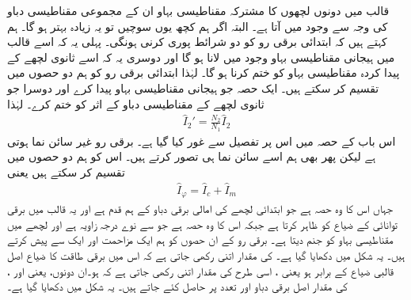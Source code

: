 قالب میں دونوں لچھوں کا مشترکہ مقناطیسی بہاو ان کے مجموعی مقناطیسی دباو کی وجہ سے وجود میں آتا ہے۔ البتہ اگر ہم کچھ یوں سوچیں تو یہ زیادہ بہتر ہو گا۔ ہم کہتے ہیں کہ ابتدائی برقی رو کو دو شرائط پوری کرنی ہونگی۔ پہلی یہ کہ اسے قالب میں ہیجانی مقناطیسی بہاو وجود میں لانا ہو گا اور دوسری یہ کہ اسے ثانوی لچھے کے پیدا کردہ مقناطیسی بہاو کو ختم کرنا ہو گا۔ لہٰذا ابتدائی برقی رو کو ہم دو حصوں میں تقسیم کر سکتے ہیں۔ ایک حصہ  جو ہیجانی مقناطیسی بہاو پیدا کرے اور دوسرا  جو ثانوی لچھے کے مقناطیسی دباو کے اثر کو ختم کرے۔ لہٰذا
\begin{align}
\hat{I}_2'=\frac{N_2}{N_1} \hat{I}_2
\end{align}
	اس باب کے حصہ   میں اس پر تفصیل سے غور کیا گیا ہے۔ برقی رو  غیر سائن نما ہوتی ہے لیکن پھر بھی  ہم اسے سائن نما   ہی تصور کرتے ہیں۔ اس کو ہم دو حصوں میں تقسیم کر سکتے ہیں یعنی
\begin{align}\label{مساوات_ٹرانسفارمر_رو_ہیجان_ضیاع_اجزاع}
\hat{I}_\varphi=\hat{I}_c+\hat{I}_m
\end{align}
جہاں  اس کا وہ حصہ ہے جو ابتدائی لچھے کی امالی برقی دباو  کے ہم قدم ہے اور یہ قالب میں برقی توانائی کے ضیاع کو ظاہر کرتا ہے جبکہ  اس کا وہ حصہ ہے جو  سے نوے درجہ زاویہ   ہے اور  لچھے میں مقناطیسی بہاو کو جنم دیتا ہے۔ برقی رو کے ان حصوں کو ہم  ایک مزاحمت   اور ایک  سے پیش کرتے ہیں۔ یہ شکل میں دکھایا گیا ہے۔ کی مقدار اتنی رکھی جاتی ہے کہ اس میں برقی طاقت کا ضیاع اصل قالبی ضیاع کے برابر ہو یعنی  ، اسی طرح  کی مقدار اتنی رکھی جاتی ہے کہ  ہو۔ان دونوں،  یعنی  اور  ، کی مقدار اصل برقی دباو اور تعدد پر حاصل کئے جاتے ہیں۔ یہ شکل   میں دکھایا گیا ہے۔


